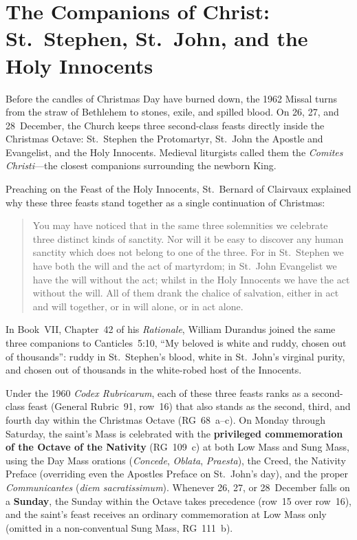\section{The Companions of Christ: St.~Stephen, St.~John, and the Holy Innocents}\label{sec:comites}

Before the candles of Christmas Day have burned down, the 1962 Missal turns from
the straw of Bethlehem to stones, exile, and spilled blood. On 26, 27, and
28~December, the Church keeps three second-class feasts directly inside the
Christmas Octave: St.~Stephen the Protomartyr, St.~John the Apostle and
Evangelist, and the Holy Innocents. Medieval liturgists called them the
\textit{Comites Christi}---the closest companions surrounding the newborn King.

Preaching on the Feast of the Holy Innocents, St.~Bernard of Clairvaux explained
why these three feasts stand together as a single continuation of Christmas:

\begin{quote}
You may have noticed that in the same three solemnities we celebrate three
distinct kinds of sanctity. Nor will it be easy to discover any human sanctity
which does not belong to one of the three. For in St.~Stephen we have both the
will and the act of martyrdom; in St.~John Evangelist we have the will without
the act; whilst in the Holy Innocents we have the act without the will. All of
them drank the chalice of salvation, either in act and will together, or in will
alone, or in act alone.
\end{quote}

In Book~VII, Chapter~42 of his \textit{Rationale}, William Durandus joined the
same three companions to Canticles~5:10, ``My beloved is white and ruddy, chosen
out of thousands'': ruddy in St.~Stephen's blood, white in St.~John's virginal
purity, and chosen out of thousands in the white-robed host of the Innocents.

Under the 1960 \textit{Codex Rubricarum}, each of these three feasts ranks as a
second-class feast (General Rubric~91, row~16) that also stands as the second,
third, and fourth day within the Christmas Octave (RG~68~a--c). On Monday
through Saturday, the saint's Mass is celebrated with the \textbf{privileged
commemoration of the Octave of the Nativity} (RG~109~c) at both Low Mass and
Sung Mass, using the Day Mass orations (\textit{Concede}, \textit{Oblata},
\textit{Praesta}), the Creed, the Nativity Preface (overriding even the Apostles
Preface on St.~John's day), and the proper \textit{Communicantes} (\textit{diem
sacratissimum}). Whenever 26, 27, or 28~December falls on a \textbf{Sunday},
the Sunday within the Octave takes precedence (row~15 over row~16), and the
saint's feast receives an ordinary commemoration at Low Mass only (omitted in a
non-conventual Sung Mass, RG~111~b).

